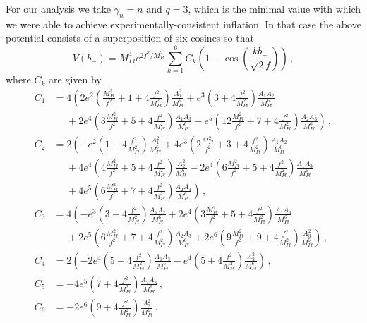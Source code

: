 \documentclass[12pt]{article}
\begin{document}
For our analysis we take $\gamma_n = n$ and $q = 3$, which is the minimal value with which we were able to achieve experimentally-consistent inflation.
In that case the above potential consists of a superposition of six cosines so that
\begin{equation} \label{eq:supergravity:Vslow3}
  V\left(b_-\right)
    = M_{Pl}^4 e^{2 f^2 / M_{Pl}^2} \sum_{k = 1}^6 C_k \left(1 - \cos\left(\frac{k b_-}{\sqrt{2} f}\right)\right)\,,
\end{equation}
where $C_k$ are given by
\begin{equation} \label{eq:supergravity:Vslow3Coefficients}
  \begin{aligned}
    C_1 &=   4 \left(
        2 e^2 \left(   \frac{M_{Pl}^2}{f^2} + 1 + 4 \frac{f^2}{M_{Pl}^2}\right) \frac{A_1^2  }{M_{Pl}^6}
      +   e^3 \left(                              3 + 4 \frac{f^2}{M_{Pl}^2}\right) \frac{A_1 A_2}{M_{Pl}^6}\right.\\
      &~~~~~~ \left.{}
      + 2 e^4 \left( 3 \frac{M_{Pl}^2}{f^2} + 5 + 4 \frac{f^2}{M_{Pl}^2}\right) \frac{A_1 A_3}{M_{Pl}^6}
      -   e^5 \left(12 \frac{M_{Pl}^2}{f^2} + 7 + 4 \frac{f^2}{M_{Pl}^2}\right) \frac{A_2 A_3}{M_{Pl}^6}
    \right)\,,\\
    C_2 &=   2 \left(
      -   e^2 \left(                              1 + 4 \frac{f^2}{M_{Pl}^2}\right) \frac{A_1^2  }{M_{Pl}^6}
      + 4 e^3 \left( 2 \frac{M_{Pl}^2}{f^2} + 3 + 4 \frac{f^2}{M_{Pl}^2}\right) \frac{A_1 A_2}{M_{Pl}^6}\right.\\
      &~~~~~~ \left.{}
      + 4 e^4 \left( 4 \frac{M_{Pl}^2}{f^2} + 5 + 4 \frac{f^2}{M_{Pl}^2}\right) \frac{A_2^2  }{M_{Pl}^6}
      - 2 e^4 \left( 6 \frac{M_{Pl}^2}{f^2} + 5 + 4 \frac{f^2}{M_{Pl}^2}\right) \frac{A_1 A_3}{M_{Pl}^6}\right.\\
      &~~~~~~ \left.{}
      + 4 e^5 \left( 6 \frac{M_{Pl}^2}{f^2} + 7 + 4 \frac{f^2}{M_{Pl}^2}\right) \frac{A_2 A_3}{M_{Pl}^6}
    \right)\,,\\
    C_3 &=   4 \left(
      -   e^3 \left(                              3 + 4 \frac{f^2}{M_{Pl}^2}\right) \frac{A_1 A_2}{M_{Pl}^6}
      + 2 e^4 \left( 3 \frac{M_{Pl}^2}{f^2} + 5 + 4 \frac{f^2}{M_{Pl}^2}\right) \frac{A_1 A_3}{M_{Pl}^6}\right.\\
      &~~~~~~ \left.{}
      + 2 e^5 \left( 6 \frac{M_{Pl}^2}{f^2} + 7 + 4 \frac{f^2}{M_{Pl}^2}\right) \frac{A_2 A_3}{M_{Pl}^6}
      + 2 e^6 \left( 9 \frac{M_{Pl}^2}{f^2} + 9 + 4 \frac{f^2}{M_{Pl}^2}\right) \frac{A_3^2  }{M_{Pl}^6}
    \right)\,,\\
    C_4 &=   2 \left(
      - 2 e^4 \left(                              5 + 4 \frac{f^2}{M_{Pl}^2}\right) \frac{A_1 A_3}{M_{Pl}^6}
      -   e^4 \left(                              5 + 4 \frac{f^2}{M_{Pl}^2}\right) \frac{A_2^2  }{M_{Pl}^6}
    \right)\,,\\
    C_5 &= - 4
          e^5 \left(                              7 + 4 \frac{f^2}{M_{Pl}^2}\right) \frac{A_2 A_3}{M_{Pl}^6}\,,\\
    C_6 &= - 2
          e^6 \left(                              9 + 4 \frac{f^2}{M_{Pl}^2}\right) \frac{A_3^2  }{M_{Pl}^6}\,.
  \end{aligned}
\end{equation}
\end{document}
